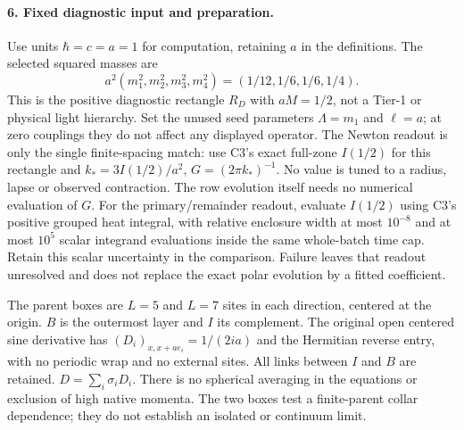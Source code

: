 \documentclass[11pt]{article}
\begin{document}
\paragraph{6. Fixed diagnostic input and preparation.}
Use units $\hbar=c=a=1$ for computation, retaining $a$ in the
definitions.  The selected squared masses are
\[
 a^2(m_1^2,m_2^2,m_3^2,m_4^2)
       =(1/12,1/6,1/6,1/4).
 \tag{XN13}
\]
This is the positive diagnostic rectangle $R_D$ with $aM=1/2$,
not a Tier-1 or physical light hierarchy.  Set the unused seed
parameters $\Lambda=m_1$ and $\ell=a$; at zero couplings they
do not affect any displayed operator.
The Newton readout is only the single finite-spacing match:
use C3's exact full-zone $I(1/2)$ for this rectangle and
$k_*=3I(1/2)/a^2$, $G=(2\pi k_*)^{-1}$.
No value is tuned to a radius, lapse or observed contraction.
The row evolution itself needs no numerical evaluation of $G$.
For the primary/remainder readout, evaluate $I(1/2)$ using C3's
positive grouped heat integral, with relative enclosure width
at most $10^{-8}$ and at most $10^5$ scalar integrand evaluations
inside the same whole-batch time cap.  Retain this scalar
uncertainty in the comparison.  Failure leaves that readout
unresolved and does not replace the exact polar evolution by
a fitted coefficient.

The parent boxes are $L=5$ and $L=7$ sites in each direction,
centered at the origin.  $B$ is the outermost layer and $I$ its
complement.  The original open centered sine derivative has
$(D_i)_{x,x+ae_i}=1/(2ia)$ and the Hermitian reverse entry,
with no periodic wrap and no external sites.  All links between
$I$ and $B$ are retained.  $D=\sum_i\sigma_iD_i$.  There is no
spherical averaging in the equations or exclusion of high native
momenta.  The two boxes test a finite-parent collar dependence;
they do not establish an isolated or continuum limit.
\end{document}
